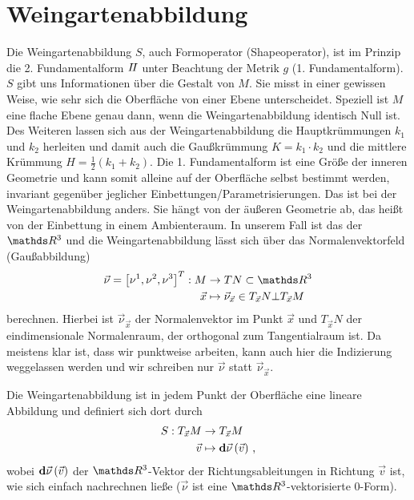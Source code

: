 \section{Weingartenabbildung}
\label{secWeingartenabbildung}
  Die Weingartenabbildung \( S \), auch Formoperator (Shapeoperator), ist im Prinzip die 2. Fundamentalform \( I \! I \) unter Beachtung der Metrik \(
 g \) (1. Fundamentalform).
  \( S \) gibt uns Informationen über die Gestalt von \( M \). 
  Sie misst in einer gewissen Weise, wie sehr sich die Oberfläche von einer Ebene unterscheidet. 
  Speziell ist \( M \) eine flache Ebene
  genau dann, wenn die Weingartenabbildung identisch Null ist.
  Des Weiteren lassen sich aus der Weingartenabbildung die Hauptkrümmungen \( k_{1} \) und \( k_{2} \) herleiten und damit auch die
  Gaußkrümmung \( K = k_{1}\cdot k_{2} \) und die mittlere Krümmung \( H = \frac{1}{2}\left( k_{1} + k_{2} \right) \).
  Die 1. Fundamentalform ist eine Größe der inneren Geometrie und kann somit alleine auf der Oberfläche
  selbst bestimmt werden,
  invariant gegenüber jeglicher Einbettungen/Parametrisierungen.
  Das ist bei der Weingartenabbildung anders. 
  Sie hängt von der äußeren Geometrie ab, 
  das heißt von der Einbettung in einem Ambienteraum.
  In unserem Fall ist das der \( \R^{3} \) und die Weingartenabbildung lässt sich über das Normalenvektorfeld 
  (Gaußabbildung)
  \begin{align}
    \vec{\nu} = \left[ \nu^{1}, \nu^{2}, \nu^{3} \right]^{T}: M &\rightarrow TN \subset \R^{3} \\
                         \vec{x} &\mapsto \vec{\nu}_{\vec{x}} \in T_{\vec{x}}N \bot T_{\vec{x}}M
  \end{align}
  berechnen. 
  Hierbei ist \( \vec{\nu}_{\vec{x}} \) der Normalenvektor im Punkt \( \vec{x} \) und \( T_{\vec{x}}N \) der eindimensionale Normalenraum,
  der orthogonal zum Tangentialraum ist. 
  Da meistens klar ist, dass wir punktweise arbeiten, kann auch hier die Indizierung weggelassen werden und wir schreiben nur 
  \( \vec{\nu} \) statt \( \vec{\nu}_{\vec{x}} \).
  \begin{definition}
    Die Weingartenabbildung ist in jedem Punkt der Oberfläche eine lineare Abbildung und definiert sich dort durch
    \begin{align}
      S: T_{\vec{x}}M &\rightarrow T_{\vec{x}}M \\
                    \vec{v} &\mapsto \mathbf{d}\vec{\nu} \left( \vec{v} \right) \,\text{,}
    \end{align}
    wobei \( \mathbf{d}\vec{\nu} \left( \vec{v} \right) \) der \( \R^{3} \)-Vektor der Richtungsableitungen in Richtung \( \vec{v}
    \) ist, wie sich einfach nachrechnen ließe (\( \vec{\nu} \) ist eine \( \R^{3} \)-vektorisierte 0-Form).
  \end{definition}

